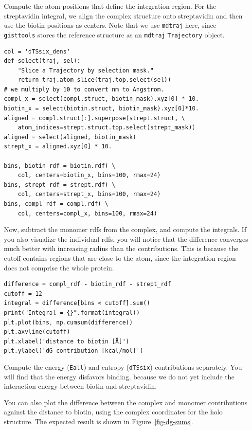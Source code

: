 \documentclass[9pt,tutorial]{livecoms}
\newcommand{\software}{\texttt}
\newcommand{\todo}{\textcolor{red}}
\newcommand\inlinecode{\texttt}
\begin{document}
Compute the atom positions that define the integration region.
For the streptavidin integral, we align the complex structure onto streptavidin and then use the biotin positions as centers.
Note that we use \software{mdtraj} here, since \software{gisttools} stores the reference structure as an \software{mdtraj} \inlinecode{Trajectory} object.
\begin{lstlisting}[style=python]
col = 'dTSsix_dens'
def select(traj, sel):
    "Slice a Trajectory by selection mask."
    return traj.atom_slice(traj.top.select(sel))
# we multiply by 10 to convert nm to Angstrom.
compl_x = select(compl.struct, biotin_mask).xyz[0] * 10.
biotin_x = select(biotin.struct, biotin_mask).xyz[0]*10.
aligned = compl.struct[:].superpose(strept.struct, \
    atom_indices=strept.struct.top.select(strept_mask))
aligned = select(aligned, biotin_mask)
strept_x = aligned.xyz[0] * 10.

bins, biotin_rdf = biotin.rdf( \
    col, centers=biotin_x, bins=100, rmax=24)
bins, strept_rdf = strept.rdf( \
    col, centers=strept_x, bins=100, rmax=24)
bins, compl_rdf = compl.rdf( \
    col, centers=compl_x, bins=100, rmax=24)
\end{lstlisting}

Now, subtract the monomer rdfs from the complex, and compute the integrals.
If you also visualize the individual rdfs, you will notice that the difference converges much better with increasing radius than the contributions.
This is because the cutoff contains regions that are close to the atom, since the integration region does not comprise the whole protein.

\begin{lstlisting}[style=python]
difference = compl_rdf - biotin_rdf - strept_rdf
cutoff = 12
integral = difference[bins < cutoff].sum()
print("Integral = {}".format(integral))
plt.plot(bins, np.cumsum(difference))
plt.axvline(cutoff)
plt.xlabel('distance to biotin [Å]')
plt.ylabel('dG contribution [kcal/mol]')
\end{lstlisting}
Compute the energy (\inlinecode{Eall}) and entropy (\inlinecode{dTSsix}) contributions separately.
You will find that the energy disfavors binding, because we do not yet include the interaction energy between biotin and streptavidin.

You can also plot the difference between the complex and monomer contributions against the distance to biotin, using the complex coordinates for the holo structure.
The expected result is shown in Figure~\ref{fig-dg-sums}.
\end{document}
